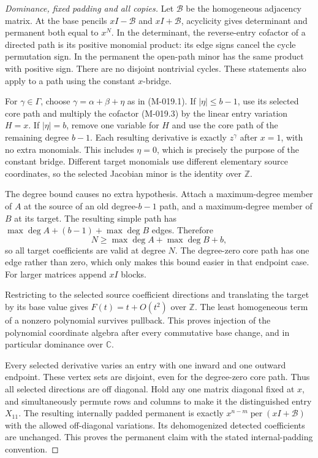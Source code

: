 \begin{proof}[Dominance, fixed padding and all copies]
Let \(\mathcal B\) be the homogeneous adjacency matrix.
At the base pencils \(xI-\mathcal B\) and
\(xI+\mathcal B\), acyclicity gives determinant and
permanent both equal to \(x^N\). In the determinant,
the reverse-entry cofactor of a directed path is its
positive monomial product: its edge signs cancel the
cycle permutation sign. In the permanent the open-path
minor has the same product with positive sign. There
are no disjoint nontrivial cycles. These statements
also apply to a path using the constant \(x\)-bridge.

For \(\gamma\in\Gamma\), choose
\(\gamma=\alpha+\beta+\eta\) as in (M-019.1).
If \(|\eta|\leq b-1\), use its selected core path
and multiply the cofactor (M-019.3) by the linear entry
variation \(H=x\). If \(|\eta|=b\), remove one variable
for \(H\) and use the core path of the remaining degree
\(b-1\). Each resulting derivative is exactly
\(z^\gamma\) after \(x=1\), with no extra monomials.
This includes \(\eta=0\), which is precisely the purpose
of the constant bridge. Different target monomials use
different elementary source coordinates, so the selected
Jacobian minor is the identity over \(\mathbb Z\).

The degree bound causes no extra hypothesis. Attach a
maximum-degree member of \(A\) at the source of an old
degree-\(b-1\) path, and a maximum-degree member of \(B\)
at its target. The resulting simple path has
\(\max\deg A+(b-1)+\max\deg B\) edges. Therefore
\[
                       N\geq\max\deg A+\max\deg B+b,
\]
so all target coefficients are valid at degree \(N\).
The degree-zero core path has one edge rather than zero,
which only makes this bound easier in that endpoint case.
For larger matrices append \(xI\) blocks.

Restricting to the selected source coefficient directions
and translating the target by its base value gives
\(F(t)=t+O(t^2)\) over \(\mathbb Z\). The least
homogeneous term of a nonzero polynomial survives pullback.
This proves injection of the polynomial coordinate algebra
after every commutative base change, and in particular
dominance over \(\mathbb C\).

Every selected derivative varies an entry with one inward
and one outward endpoint. These vertex sets are disjoint,
even for the degree-zero core path. Thus all selected
directions are off diagonal. Hold any one matrix diagonal
fixed at \(x\), and simultaneously permute rows and
columns to make it the distinguished entry \(X_{11}\).
The resulting internally padded permanent is exactly
\(x^{n-m}\operatorname{per}(xI+\mathcal B)\) with the
allowed off-diagonal variations. Its dehomogenized detected
coefficients are unchanged. This proves the permanent
claim with the stated internal-padding convention.


\end{proof}
